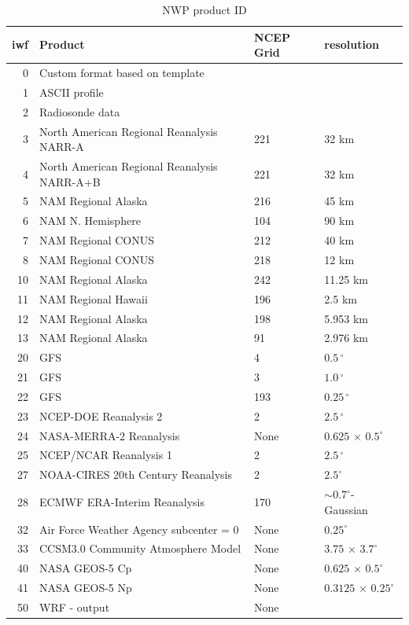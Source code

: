 \documentclass[11pt]{article}   %
\begin{document}
\begin{table}[h]\label{Tabiwf}
\caption{NWP product ID}
\begin{tabular}{| r | l | l | l |}
\hline
iwf & Product & NCEP Grid & resolution \\
\hline
  0 & Custom format based on template & & \\
  1 & ASCII profile & & \\
  2 & Radiosonde data & & \\
\hline
  3 & North American Regional Reanalysis NARR-A & 221 & 32 km \\
  4 & North American Regional Reanalysis NARR-A+B &221 & 32 km \\
  5 & NAM Regional Alaska & 216 & 45 km \\
  6 & NAM N. Hemisphere & 104 & 90 km \\
  7 & NAM Regional CONUS & 212 & 40 km \\
  8 & NAM Regional CONUS & 218 & 12 km \\
 10 & NAM Regional Alaska & 242 & 11.25 km \\
 11 & NAM Regional Hawaii & 196 & 2.5 km \\
 12 & NAM Regional Alaska & 198 & 5.953 km \\
 13 & NAM Regional Alaska & 91 & 2.976 km \\
\hline
 20 & GFS & 4   & $ 0.5 \, ^{\circ}$ \\
 21 & GFS & 3   & $ 1.0 \, ^{\circ}$ \\
 22 & GFS & 193 & $0.25 \, ^{\circ}$ \\
 23 & NCEP-DOE Reanalysis 2 & 2  & $2.5 \, ^{\circ}$ \\
 24 & NASA-MERRA-2 Reanalysis & None & $0.625 \, \times \,0.5^{\circ}$ \\
 25 & NCEP/NCAR Reanalysis 1 & 2 & $2.5 \, ^{\circ}$ \\
 27 & NOAA-CIRES 20th Century Reanalysis & 2 & $2.5^{\circ}$ \\
 28 & ECMWF ERA-Interim Reanalysis & 170 & $\sim 0.7^{\circ}$-Gaussian \\
\hline
 32 & Air Force Weather Agency subcenter = 0 & None & $0.25^{\circ}$ \\
 33 & CCSM3.0 Community Atmosphere Model &None & $3.75 \, \times \,3.7^{\circ}$\\
\hline
 40 & NASA GEOS-5 Cp & None & $0.625 \, \times \,0.5^{\circ}$ \\
 41 & NASA GEOS-5 Np & None & $0.3125 \, \times \,0.25^{\circ}$\\
 50 & WRF - output & None & \\
\hline
\end{tabular}
\end{table}
\clearpage
\end{document}
